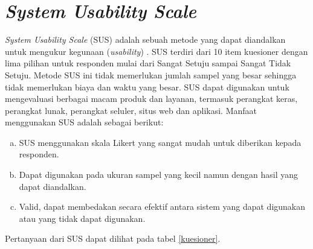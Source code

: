 \section{\textit{System Usability Scale}}
\textit{System Usability Scale }(SUS) adalah sebuah metode yang dapat diandalkan untuk mengukur kegunaan (\textit{usability}) \citep{brook1996}. SUS terdiri dari 10 item kuesioner dengan lima pilihan untuk responden mulai dari Sangat Setuju sampai Sangat Tidak Setuju. Metode SUS ini tidak memerlukan jumlah sampel yang besar sehingga tidak memerlukan biaya dan waktu yang besar. SUS dapat digunakan untuk mengevaluasi berbagai macam produk dan layanan, termasuk perangkat keras, perangkat lunak, perangkat seluler, situs web dan aplikasi.
Manfaat menggunakan SUS adalah sebagai berikut:
\begin{enumerate}[a.]
	\item SUS menggunakan skala Likert yang sangat mudah untuk diberikan kepada responden.
	\item Dapat digunakan pada ukuran sampel yang kecil namun dengan hasil yang dapat diandalkan.
	\item Valid, dapat membedakan secara efektif antara sistem yang dapat digunakan atau yang tidak dapat digunakan.
\end{enumerate}

Pertanyaan dari SUS dapat dilihat pada tabel \ref{kuesioner}.


